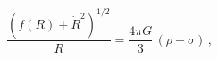 \begin{equation}
\frac{\left(f(R)+\dot{R}^2\right)^{1/2}}{R}=\frac{4\pi G}{3}\,(\rho+\sigma)\,,
\label{FRW-1}
\end{equation}

